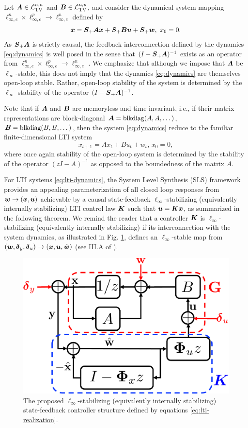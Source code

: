 Let $\boldsymbol{A} \in \mathcal{L}_{\mathrm{TV}}^{n,n}$ and $\boldsymbol{B} \in \mathcal{L}_{\mathrm{TV}}^{n,p}$, and consider the dynamical system mapping $\ell^n_{\infty,e} \times \ell^p_{\infty,e} \to \ell^n_{\infty,e}$ defined by
\begin{equation}
\boldsymbol{x} = \boldsymbol{S}_+\boldsymbol{A}\boldsymbol{x} + \boldsymbol{S}_+ \boldsymbol{B} \boldsymbol{u} + \boldsymbol{S}_+ \boldsymbol{w}, \ x_0 = 0.
\label{eq:dynamics}
\end{equation}
As $\boldsymbol{S}_+\boldsymbol{A}$ is strictly causal, the feedback interconnection defined by the dynamics \eqref{eq:dynamics} is well posed in the sense that $(I-\boldsymbol{S}_+\boldsymbol{A})^{-1}$ exists as an operator from $\ell^n_{\infty,e} \times \ell^p_{\infty,e} \to \ell^n_{\infty,e}$ \cite{dahleh1994control}.  We emphasize that although we impose that $\boldsymbol{A}$ be $\ell_\infty$-stable, this does not imply that the dynamics \eqref{eq:dynamics} are themselves open-loop stable.  Rather, open-loop stability of the system is determined by the $\ell_\infty$ stability of the operator $(I-\boldsymbol{S}_+\boldsymbol{A})^{-1}$.

Note that if $\boldsymbol{A}$ and $\boldsymbol{B}$ are memoryless and time invariant, i.e., if their matrix representations are block-diagonal $\boldsymbol{A} = \mathrm{blkdiag}(A,A,\dots)$, $\boldsymbol{B} = \mathrm{blkdiag}(B,B,\dots)$, then the system \eqref{eq:dynamics} reduce to the familiar finite-dimensional LTI system
\begin{equation}
x_{t+1} = A x_t + Bu_t + w_t, \, x_0 = 0,
\label{eq:lti-dynamics}
\end{equation}
where once again stability of the open-loop system is determined by the stability of the operator $(zI-A)^{-1}$ as opposed to the boundedness of the matrix $A$.

For LTI systems \eqref{eq:lti-dynamics}, the System Level Synthesis (SLS) framework \cite{wang2019system,anderson2019system} provides an appealing parameterization of all closed loop responses from $\boldsymbol{w} \to (\boldsymbol{x}, \boldsymbol{u})$ achievable by a causal state-feedback $\ell_\infty$-stabilizing (equivalently internally stabilizing) LTI control law $\boldsymbol{K}$ such that $\boldsymbol{u} = \boldsymbol{K} \boldsymbol{x}$, as summarized in the following theorem.  We remind the reader that a controller $\boldsymbol{K}$ is $\ell_\infty$-stabilizing (equivalently internally stabilizing) if its interconnection with the system dynamics, as illustrated in Fig. \ref{fig:lti-interconnect}, defines an $\ell_\infty$-stable map from $(\boldsymbol{w}, \boldsymbol{\delta}_y, \boldsymbol{\delta}_u) \to (\boldsymbol{x}, \boldsymbol{u}, \hat{\boldsymbol{w}})$ (see III.A of \cite{wang2019system}).

\begin{figure}
\centering
\includegraphics[width=.35\textwidth]{lti-interconnect}
\caption{The proposed $\ell_\infty$-stabilizing (equivalently internally stabilizing) state-feedback controller structure defined by equations \eqref{eq:lti-realization}.}
\label{fig:lti-interconnect}
\end{figure}


